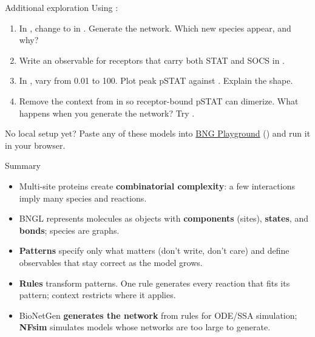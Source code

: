 \documentclass[aspectratio=169,10pt,t]{beamer}
\newcommand{\bngplayground}{https://ruleworld.github.io/bngplayground/}
\begin{document}
\begin{frame}{Additional exploration}
  Using :
  \begin{enumerate}
    \setlength\itemsep{1.5mm}
    \item In , change  to  in
          . Generate the network. Which new species appear, and why?
    \item Write an observable for receptors that carry both STAT and SOCS in
          .
    \item In , vary  from 0.01 to 100.
          Plot peak pSTAT against . Explain the shape.
    \item Remove the  context from  in
           so receptor-bound pSTAT can dimerize.
          What happens when you generate the network? Try
          .
  \end{enumerate}
  \vskip3mm
  {\small No local setup yet? Paste any of these models into
  \href{\bngplayground}{BNG Playground} ()
  and run it in your browser.}
\end{frame}

\begin{frame}{Summary}
  \begin{itemize}[<+->]
    \setlength\itemsep{2mm}
    \item Multi-site proteins create \textbf{combinatorial complexity}: a few
          interactions imply many species and reactions.
    \item BNGL represents molecules as objects with \textbf{components} (sites),
          \textbf{states}, and \textbf{bonds}; species are graphs.
    \item \textbf{Patterns} specify only what matters (don't write, don't care) and
          define observables that stay correct as the model grows.
    \item \textbf{Rules} transform patterns. One rule generates every reaction that
          fits its pattern; context restricts where it applies.
    \item BioNetGen \textbf{generates the network} from rules for ODE/SSA simulation;
          \textbf{NFsim} simulates models whose networks are too large to generate.
  \end{itemize}
\end{frame}
\end{document}
